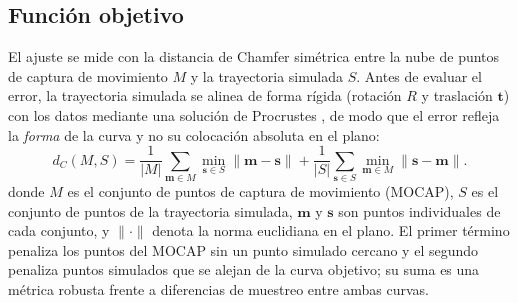 \documentclass[conference]{IEEEtran}
\begin{document}
\subsection{Función objetivo}
El ajuste se mide con la distancia de Chamfer \cite{ref_chamfer} simétrica entre
la nube de puntos de captura de movimiento $M$ y la trayectoria simulada $S$.
Antes de evaluar el error, la trayectoria simulada se alinea de forma rígida
(rotación $R$ y traslación $\mathbf{t}$) con los datos mediante una solución de
Procrustes \cite{ref_procrustes}, de modo que el error refleja la \emph{forma}
de la curva y no su colocación absoluta en el plano:
\begin{equation}
d_C(M,S)=\frac{1}{|M|}\!\sum_{\mathbf{m}\in M}\!\min_{\mathbf{s}\in S}\lVert \mathbf{m}-\mathbf{s}\rVert
+\frac{1}{|S|}\!\sum_{\mathbf{s}\in S}\!\min_{\mathbf{m}\in M}\lVert \mathbf{s}-\mathbf{m}\rVert .
\label{eq:chamfer}
\end{equation}
donde $M$ es el conjunto de puntos de captura de movimiento (MOCAP), $S$ es el
conjunto de puntos de la trayectoria simulada, $\mathbf{m}$ y $\mathbf{s}$ son
puntos individuales de cada conjunto, y $\lVert\cdot\rVert$ denota la norma
euclidiana en el plano.
El primer término penaliza los puntos del MOCAP sin un punto simulado cercano y
el segundo penaliza puntos simulados que se alejan de la curva objetivo; su suma
es una métrica robusta frente a diferencias de muestreo entre ambas curvas.
\end{document}
